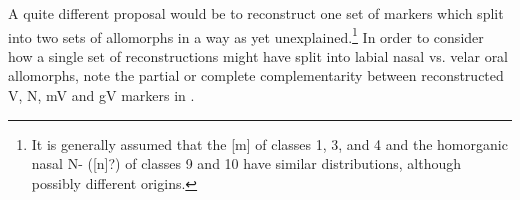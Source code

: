 \documentclass[output=paper]{langsci/langscibook}
\begin{document}
A quite different proposal would be to reconstruct one set of markers which split into two sets of allomorphs in a way as yet unexplained.\footnote{It is generally assumed that the [m] of classes 1, 3, and 4 and the homorganic nasal N- ([n]?) of classes 9 and 10 have similar distributions, although possibly different origins.} In order to consider how a single set of reconstructions might have split into labial nasal vs. velar oral allomorphs, note the partial or complete complementarity between reconstructed V, N, mV and gV markers in .

\begin{table}
\caption{Reconstructed Noun Class markers arranged by place of articulation}
\label{tab:nasal:4}
\end{table}
\end{document}
